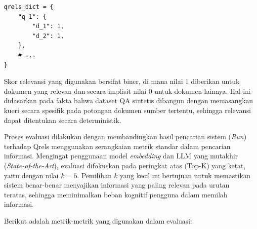 \begin{verbatim}
qrels_dict = {
    "q_1": {
        "d_1": 1,
        "d_2": 1,
    },
    # ...
}
\end{verbatim}

Skor relevansi yang digunakan bersifat biner, di mana nilai 1 diberikan untuk dokumen yang relevan dan secara implisit nilai 0 untuk dokumen lainnya. Hal ini didasarkan pada fakta bahwa dataset QA sintetis dibangun dengan memasangkan kueri secara spesifik pada potongan dokumen sumber tertentu, sehingga relevansi dapat ditentukan secara deterministik.

Proses evaluasi dilakukan dengan membandingkan hasil pencarian sistem (\textit{Run}) terhadap Qrels menggunakan serangkaian metrik standar dalam pencarian informasi. Mengingat penggunaan model \textit{embedding} dan LLM yang mutakhir (\textit{State-of-the-Art}), evaluasi difokuskan pada peringkat atas (Top-K) yang ketat, yaitu dengan nilai $k=5$. Pemilihan $k$ yang kecil ini bertujuan untuk memastikan sistem benar-benar menyajikan informasi yang paling relevan pada urutan teratas, sehingga meminimalkan beban kognitif pengguna dalam memilah informasi.

Berikut adalah metrik-metrik yang digunakan dalam evaluasi:

